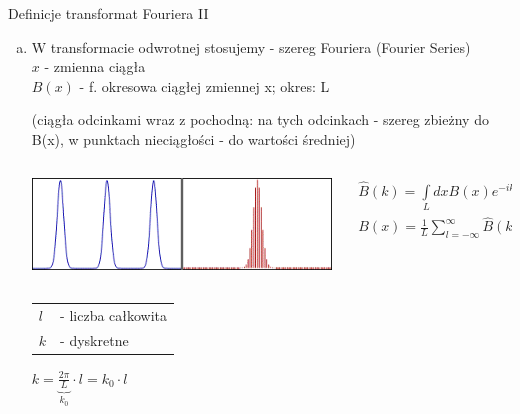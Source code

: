 \begin{frame}{Definicje transformat Fouriera II}
	\begin{enumerate}[b)]
			\item W transformacie odwrotnej stosujemy - szereg Fouriera (Fourier Series) \\
		$x$ - zmienna ciągła \\
		$B(x)$ - f. okresowa ciągłej zmiennej x; okres: L
		\begin{center}
			(ciągła odcinkami wraz z pochodną: na tych odcinkach - szereg zbieżny do B(x), w punktach nieciągłości - do wartości średniej)
		
		\end{center}
        \begin{columns}
            \begin{column}{0.35\textwidth}
                \includegraphics[width=\textwidth]{img/16/fs_wykres1.png}
            \end{column}
            \begin{column}{0.65\textwidth}
                \begin{block}
                    \centering
                    \renewcommand{\arraystretch}{1.5}
                    \setlength{\abovedisplayskip}{0pt}
                    \setlength{\belowdisplayskip}{0pt}
                    \setlength{\abovedisplayshortskip}{0pt}
                    \setlength{\belowdisplayshortskip}{0pt}
                    \[
                        \begin{array}{c}
                            \widehat{B}(k) = \int\limits_{L}dx B(x) e^{-ikx} \\
                            B(x) = \frac{1}{L}\sum\limits_{l = -\infty}^{\infty} \widehat{B}(k) e^{ikx}
                        \end{array}
                        \tag{16.2}
                    \]
                \end{block}
            \end{column}
        \end{columns}
		\begin{tabular}{ll}
			$l$ & - liczba całkowita \\
			$k$ & - dyskretne
		\end{tabular}
		\hfill $k = \underbrace{\frac{2 \pi}{L}}_{k_0} \cdot l = k_0 \cdot l$
	\end{enumerate}
\end{frame}
